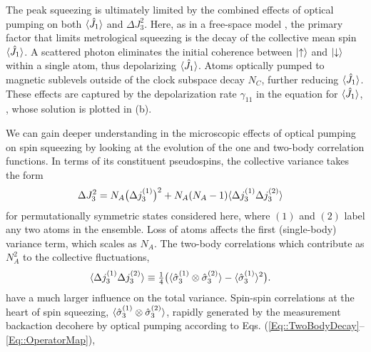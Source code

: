 \documentclass[aps,pra,twocolumn]{revtex4-1} %
\newcommand{\varz}{\Delta J_3^2}
\newcommand{\jx}{\hat{J}_1}
\begin{document}
The peak squeezing is ultimately limited by the combined effects of optical pumping on both $\expt{\jx}$ and $\varz$.  Here, as in a free-space model \cite{baragiola_three-dimensional_2014}, the primary factor that limits metrological squeezing is the decay of the collective mean spin $\expt{\jx}$. 
A scattered photon eliminates the initial coherence between $\lvert{\uparrow}\rangle$ and $\lvert{\downarrow}\rangle$ within a single atom, thus depolarizing $\expt{\jx}$.  
Atoms optically pumped to magnetic sublevels outside of the clock subspace decay $N_C$, further reducing $\expt{\jx}$. 
These effects are captured by the depolarization rate $\gamma_{11}$ in the equation for $\expt{\jx}$, , whose solution is plotted in (b).

We can gain deeper understanding in the microscopic effects of optical pumping on spin squeezing by looking at the evolution of the one and two-body correlation functions.  In terms of its constituent pseudospins, the collective variance takes the form
	\begin{align} \label{Eq::VarianceDecomposition}
	\varz & = N_A \big( \Delta j_3^{(1)} \big)^2 + N_A(N_A-1) \expt{ \Delta j_3^{(1)} \Delta j_3^{(2)} }
	\end{align}
for permutationally symmetric states considered here, {\color{blue} where $(1)$ and $(2)$ label any two atoms in the ensemble}. Loss of atoms affects the first (single-body) variance term, which scales as $N_A$.
The two-body correlations which contribute as $N_A^2$ to the collective fluctuations, 
	\begin{align}
		\langle{ \Delta j_3^{(1)} \Delta j_3^{(2)} }\rangle &\equiv \mbox{$\frac{1}{4}$} \big( \langle{ \hat{\sigma}_3^{(1)} \otimes \hat{\sigma}_3^{(2)}  }\rangle - \langle{\hat{\sigma}_3^{(1)} }\rangle^2  \big).
\end{align}
have a much larger influence on the total variance. Spin-spin correlations at the heart of spin squeezing, $\langle{ \hat{\sigma}_3^{(1)} \otimes \hat{\sigma}_3^{(2)} }\rangle$, rapidly generated by the measurement backaction decohere by optical pumping according to Eqs. (\ref{Eq::TwoBodyDecay}--\ref{Eq::OperatorMap}),
\end{document}
